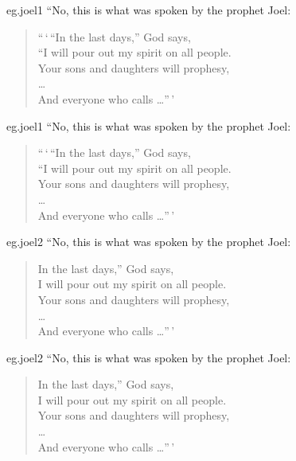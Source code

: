 \begin{egsource}{eg.joel1}
\noindent ``No, this is what was spoken by the prophet Joel:
\begin{verse}
``\,`\,``In the last days,'' God says, \\
``I will pour out my spirit on all people. \\
Your sons and daughters will prophesy, \\
\ldots \\
And everyone who calls \ldots ''\,'
\end{verse}
\end{egsource}

\begin{egresult}{eg.joel1}
\noindent ``No, this is what was spoken by the prophet Joel:
\begin{verse}
``\,`\,``In the last days,'' God says, \\
``I will pour out my spirit on all people. \\
Your sons and daughters will prophesy, \\
\ldots \\
And everyone who calls \ldots ''\,'
\end{verse}
\end{egresult}

\begin{egsource}{eg.joel2}
\noindent ``No, this is what was spoken by the prophet Joel:
\begin{verse}
In the last days,'' God says, \\
I will pour out my spirit on all people. \\
Your sons and daughters will prophesy, \\
\ldots \\
And everyone who calls \ldots ''\,'
\end{verse}
\end{egsource}

\begin{egresult}{eg.joel2}
\noindent ``No, this is what was spoken by the prophet Joel:
\begin{verse}
In the last days,'' God says, \\
I will pour out my spirit on all people. \\
Your sons and daughters will prophesy, \\
\ldots \\
And everyone who calls \ldots ''\,'
\end{verse}
\end{egresult}



